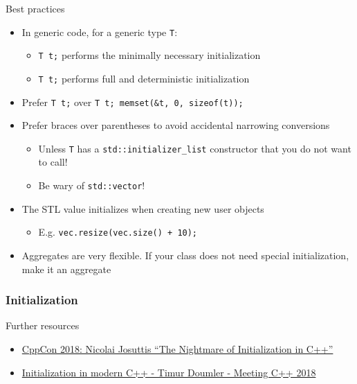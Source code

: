 \begin{frame}[fragile]
  \begin{exampleblock}{Best practices}
    \begin{itemize}
      \item In generic code, for a generic type \texttt{T}:
      \begin{itemize}
        \item \texttt{T t;} performs the minimally necessary initialization
        \item \texttt{T t{};} performs full and deterministic initialization
      \end{itemize}
      \item Prefer \texttt{T t{};} over \texttt{T t; memset(&t, 0, sizeof(t));}
      \item Prefer braces over parentheses to avoid accidental narrowing conversions
      \begin{itemize}
        \item Unless \texttt{T} has a \texttt{std::initializer_list} constructor that you do not want to call!
        \item Be wary of \texttt{std::vector}!
      \end{itemize}
      \item The STL value initializes when creating new user objects
      \begin{itemize}
        \item E.g. \texttt{vec.resize(vec.size() + 10);}
      \end{itemize}
      \item Aggregates are very flexible. If your class does not need special initialization, make it an aggregate
    \end{itemize}
  \end{exampleblock}
\end{frame}

\begin{frame}[fragile]
  \frametitle{Initialization}
  \begin{block}{Further resources}
    \begin{itemize}
      \item \href{https://www.youtube.com/watch?v=7DTlWPgX6zs}{CppCon 2018: Nicolai Josuttis “The Nightmare of Initialization in C++”}
      \item \href{https://www.youtube.com/watch?v=ZfP4VAK21zc}{Initialization in modern C++ - Timur Doumler - Meeting C++ 2018}
    \end{itemize}
  \end{block}
\end{frame}

